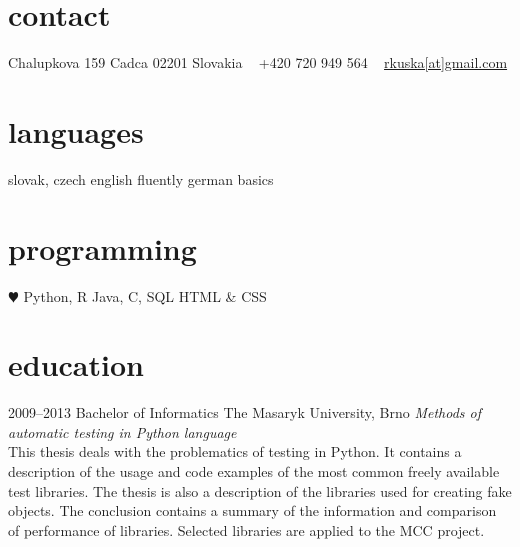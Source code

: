 \documentclass[]{friggeri-cv} %
\begin{document}


\begin{aside} %
\section{contact}
Chalupkova 159
Cadca 02201
Slovakia
~
+420 720 949 564
~
\href{mailto:rkuska@gmail.com}{rkuska[at]gmail.com}
\section{languages}
slovak, czech
english fluently
german basics 
\section{programming}
{\color{red} $\varheartsuit$} Python, R
Java, C, SQL
HTML \& CSS
\end{aside}


\section{education}

\begin{entrylist}


\entry
{2009--2013}
{Bachelor {\normalfont of Informatics}}
{The Masaryk University, Brno}
{\emph{Methods of automatic testing in Python language} \\ This thesis deals with the problematics of testing in Python. It contains a description of the usage and code examples of the most common freely available test libraries. The thesis is also a description of the libraries used for creating fake objects. The conclusion contains a summary of the information and comparison of performance of libraries. Selected libraries are applied to the MCC project.}



\end{entrylist}
\end{document}
